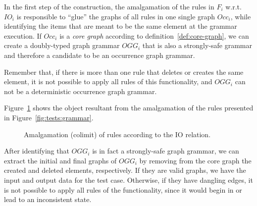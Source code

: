 In the first step of the construction, the amalgamation of the rules in $F_i$ w.r.t. $IO_i$ is responsible to ``glue'' the graphs of all rules in one single graph $Occ_i$, while identifying the items that are meant to be the same element at the grammar execution. %
If $Occ_i$ is a \emph{core graph} according to definition~\ref{def:core-graph}, we can create a doubly-typed graph grammar $OGG_i$ that is also a strongly-safe grammar and therefore a candidate to be an occurrence graph grammar.

Remember that, if there is more than one rule that deletes or creates the same element, it is not possible to apply all rules of this functionality, and $OGG_i$ can not be a deterministic occurrence graph grammar.

\begin{example}\label{ex:amalgamation} Figure~\ref{fig:tests:colimit} shows the object resultant from the amalgamation of the rules presented in Figure~\ref{fig:tests:grammar}.

\begin{figure}[!ht]
  \centering
  \caption{Amalgamation (colimit) of rules according to the IO relation.}\label{fig:tests:colimit}
\end{figure}

\end{example}

After identifying that $OGG_i$ is in fact a strongly-safe graph grammar, we can extract the initial and final graphs of $OGG_i$ by removing from the core graph the created and deleted elements, respectively. If they are valid graphs, we have the input and output data for the test case. Otherwise, if they have dangling edges, it is not possible to apply all rules of the functionality, since it would begin in or lead to an inconsistent state.

